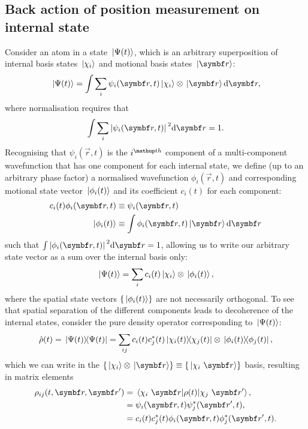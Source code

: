 \subsection{Back action of position measurement on internal state}\label{sec:backaction}

Consider an atom in a state $\ket{\Psi(t)}$, which is an arbitrary superposition of internal basis states $\ket{\chi_i}$ and motional basis states $\ket{\vec r}$: 
\begin{align}
\ket{\Psi(t)} = \int \sum_i \psi_i(\vec r, t) \ket{\chi_i}\otimes\ket{\vec r} \dd\vec r,
\end{align}
where normalisation requires that
\begin{align}
\int \sum_i \abs{\psi_i(\vec r, t)}^2 \dd\vec r = 1.
\end{align}
Recognising that $\psi_i(\vec r, t)$ is the $i^\up{th}$ component of a multi-component wavefunction that has one component for each internal state, we define (up to an arbitrary phase factor) a normalised wavefunction $\phi_i(\vec r, t)$ and corresponding motional state vector $\ket{\phi_i(t)}$ and its coefficient $c_i(t)$ for each component:
\begin{align}\label{eq:product_state_vector}
c_i(t)\phi_i(\vec r, t) &\equiv \psi_i(\vec r, t) \\
\ket{\phi_i(t)} &\equiv \int \phi_i(\vec r, t)\ket{\vec r}\dd \vec r
\end{align}
such that $\int\abs{\phi_i(\vec r, t)}^2\dd \vec r = 1$, allowing us to write our arbitrary state vector as a sum over the internal basis only:
\begin{align}
\ket{\Psi(t)} = \sum_i c_i(t) \ket{\chi_i}\otimes\ket{\phi_i(t)},
\end{align}
where the spatial state vectors $\{\ket{\phi_i(t)}\}$ are not necessarily orthogonal. To see that spatial separation of the different components leads to decoherence of the internal states, consider the pure density operator corresponding to $\ket{\Psi(t)}$:
\begin{align}
\hat\rho(t) = \ketbra{\Psi(t)}{\Psi(t)} = \sum_{ij}
c_i(t) c_j^*(t)\ketbra{\chi_i(t)}{\chi_j(t)}\otimes\ketbra{\phi_i(t)}{\phi_j(t)},
\end{align}
which we can write in the $\{\ket{\chi_i}\otimes\ket{\vec r}\} \equiv \{\ket{\chi_i\ \vec r}\} $ basis, resulting in matrix elements
\begin{align}
\rho_{ij}(t, \vec r, \vec r^\prime) &= \matrixel{\chi_i\ \vec r}{\rho(t)}{\chi_j\ \vec r^\prime},\\
&= \psi_i(\vec r, t)\psi_j^*(\vec r^\prime, t),\\
&= c_i(t) c^*_j(t) \phi_i(\vec r, t) \phi_j^*(\vec r^\prime, t).
\end{align}
